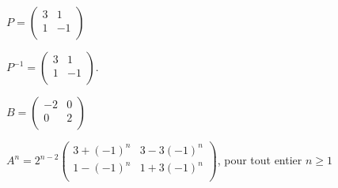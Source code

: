 \begin{multi}
    \item* \(P=\left(\begin{array}{rc}3&1\\1&-1\\
\end{array}\right)  \)
    \item \(P^{-1}= \left(\begin{array}{rc}3&1\\1&-1\\
\end{array}\right).\)
    \item \(B= \left(\begin{array}{rc}-2&0\\0&2\\
\end{array}\right)  \)
    \item* \(A^n= 2^{n-2}\left(\begin{array}{rc}
3+(-1)^n&3-3(-1)^n\\
1-(-1)^n &1+3(-1)^n\\
\end{array}\right) \), pour tout entier \(n\ge1\)
\end{multi}


